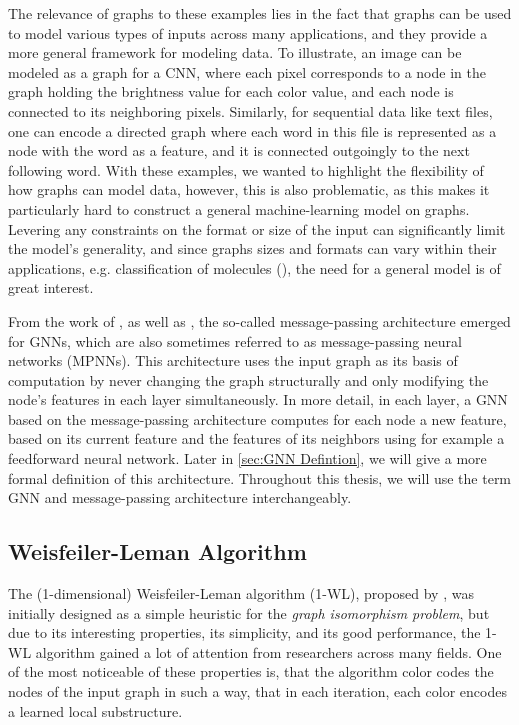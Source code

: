 \documentclass[11pt, dvipsnames, DIV=12]{scrreprt}
\theoremstyle{definition}
\begin{document}
The relevance of graphs to these examples lies in the fact that graphs can be used to model various types of inputs across many applications, and they provide a more general framework for modeling data. To illustrate, an image can be modeled as a graph for a CNN, where each pixel corresponds to a node in the graph holding the brightness value for each color value, and each node is connected to its neighboring pixels. Similarly, for sequential data like text files, one can encode a directed graph where each word in this file is represented as a node with the word as a feature, and it is connected outgoingly to the next following word. With these examples, we wanted to highlight the flexibility of how graphs can model data, however, this is also problematic, as this makes it particularly hard to construct a general machine-learning model on graphs. Levering any constraints on the format or size of the input can significantly limit the model's generality, and since graphs sizes and formats can vary within their applications, e.g. classification of molecules (\cite{Mor+2020}), the need for a general model is of great interest.

From the work of \cite{Gil+2017}, as well as \cite{Sca+2009}, the so-called message-passing architecture emerged for GNNs, which are also sometimes referred to as message-passing neural networks (MPNNs). This architecture uses the input graph as its basis of computation by never changing the graph structurally and only modifying the node's features in each layer simultaneously. In more detail, in each layer, a GNN based on the message-passing architecture computes for each node a new feature, based on its current feature and the features of its neighbors using for example a feedforward neural network. Later in \autoref{sec:GNN Defintion}, we will give a more formal definition of this architecture.
Throughout this thesis, we will use the term GNN and message-passing architecture interchangeably.
 

\subsection{Weisfeiler-Leman Algorithm}
The (1-dimensional) Weisfeiler-Leman algorithm (1-WL), proposed by \cite{Wei+1968}, was initially designed as a simple heuristic for the \textit{graph isomorphism problem}, but due to its interesting properties, its simplicity, and its good performance, the 1-WL algorithm gained a lot of attention from researchers across many fields. One of the most noticeable of these properties is, that the algorithm color codes the nodes of the input graph in such a way, that in each iteration, each color encodes a learned local substructure.
\end{document}
